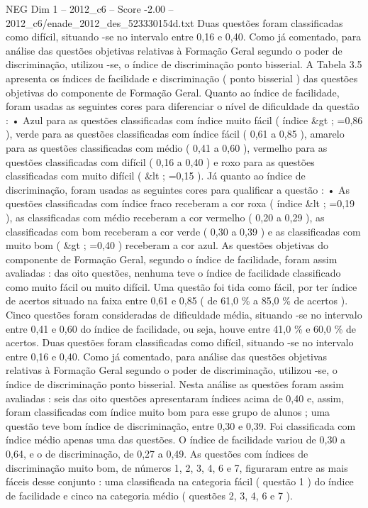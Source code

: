\begin{textsample}{NEG Dim 1 – 2012\_c6 – Score -2.00 – 2012\_c6/enade\_2012\_des\_523330154d.txt}
Duas questões foram classificadas como difícil, situando -se no intervalo entre 0,16 e 0,40.
Como já comentado, para análise das questões objetivas relativas à Formação Geral segundo o poder de discriminação, utilizou -se, o índice de discriminação ponto bisserial.
A Tabela 3.5 apresenta os índices de facilidade e discriminação ( ponto bisserial ) das questões objetivas do componente de Formação Geral.
Quanto ao índice de facilidade, foram usadas as seguintes cores para diferenciar o nível de dificuldade da questão : • Azul para as questões classificadas com índice muito fácil ( índice \&gt ; =0,86 ), verde para as questões classificadas com índice fácil ( 0,61 a 0,85 ), amarelo para as questões classificadas com médio ( 0,41 a 0,60 ), vermelho para as questões classificadas com difícil ( 0,16 a 0,40 ) e roxo para as questões classificadas com muito difícil ( \&lt ; =0,15 ).
Já quanto ao índice de discriminação, foram usadas as seguintes cores para qualificar a questão : • As questões classificadas com índice fraco receberam a cor roxa ( índice \&lt ; =0,19 ), as classificadas com médio receberam a cor vermelho ( 0,20 a 0,29 ), as classificadas com bom receberam a cor verde ( 0,30 a 0,39 ) e as classificadas com muito bom ( \&gt ; =0,40 ) receberam a cor azul.
As questões objetivas do componente de Formação Geral, segundo o índice de facilidade, foram assim avaliadas : das oito questões, nenhuma teve o índice de facilidade classificado como muito fácil ou muito difícil.
Uma questão foi tida como fácil, por ter índice de acertos situado na faixa entre 0,61 e 0,85 ( de 61,0 \% a 85,0 \% de acertos ).
Cinco questões foram consideradas de dificuldade média, situando -se no intervalo entre 0,41 e 0,60 do índice de facilidade, ou seja, houve entre 41,0 \% e 60,0 \% de acertos.
Duas questões foram classificadas como difícil, situando -se no intervalo entre 0,16 e 0,40.
Como já comentado, para análise das questões objetivas relativas à Formação Geral segundo o poder de discriminação, utilizou -se, o índice de discriminação ponto bisserial.
Nesta análise as questões foram assim avaliadas : seis das oito questões apresentaram índices acima de 0,40 e, assim, foram classificadas com índice muito bom para esse grupo de alunos ; uma questão teve bom índice de discriminação, entre 0,30 e 0,39.
Foi classificada com índice médio apenas uma das questões.
O índice de facilidade variou de 0,30 a 0,64, e o de discriminação, de 0,27 a 0,49.
As questões com índices de discriminação muito bom, de números 1, 2, 3, 4, 6 e 7, figuraram entre as mais fáceis desse conjunto : uma classificada na categoria fácil ( questão 1 ) do índice de facilidade e cinco na categoria médio ( questões 2, 3, 4, 6 e 7 ).

\end{textsample}
